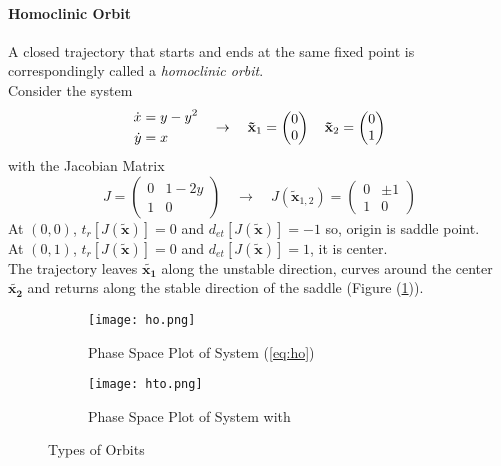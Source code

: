\paragraph{Homoclinic Orbit}
A closed trajectory that starts and ends at the same fixed point is correspondingly called a \emph{homoclinic orbit}.\\
Consider the system
\begin{equation}{\label{eq:ho}}
	\begin{aligned}
		\dot{x}&=y-y^2\\
		\dot{y}&=x
	\end{aligned}\quad\rightarrow\quad
	\mathbf{\tilde{x}}_1=
	\begin{pmatrix}
		0\\0
	\end{pmatrix}\quad
	\mathbf{\tilde{x}}_2=
	\begin{pmatrix}
		0\\1
	\end{pmatrix}
\end{equation}
with the Jacobian Matrix
\begin{equation}
	J=\begin{pmatrix}
		0&1-2y\\1&0
	\end{pmatrix}\quad\rightarrow\quad
	J(\mathbf{\tilde{x}}_{1,2})=
	\begin{pmatrix}
		0&\pm1\\1&0
	\end{pmatrix}
\end{equation}
At $(0,0)$, $t_r[J(\mathbf{\tilde{x}})]=0$ and $d_{et}[J({\mathbf{\tilde{x}}})]=-1$ so, origin is saddle point.\\
At $(0,1)$, $t_r[J(\mathbf{\tilde{x}})]=0$ and $d_{et}[J({\mathbf{\tilde{x}}})]=1$, it is center.\\
The trajectory leaves $\mathbf{\tilde{x_1}}$ along the unstable direction, curves around the center $\mathbf{\tilde{x_2}}$ and returns along the stable direction of the saddle (Figure (\ref{fig:ho})).
\begin{figure}[h!]
	\centering
	\begin{subfigure}{0.328125\linewidth}
		\centering
		\texttt{[image: ho.png]}
		\caption{Phase Space Plot of System (\ref{eq:ho})}
		\label{fig:ho}
	\end{subfigure}
	\vline
	\begin{subfigure}{0.35\linewidth}
		\centering
		\texttt{[image: hto.png]}
		\caption{Phase Space Plot of System with\\  }
		\label{fig:hto}
	\end{subfigure}
	\caption{Types of Orbits}
	\label{fig:nlo}
\end{figure}
